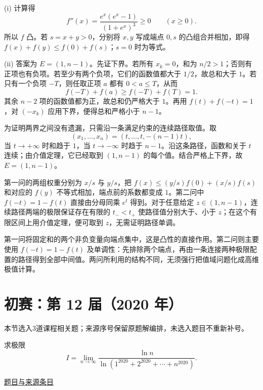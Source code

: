 \documentclass[12pt,fontset=fandol]{ctexart}
\begin{document}
\begin{solve}\label{ans:ch10-11th-A:6}

(i) 计算得
\[
f''(x)=\frac{e^x(e^x-1)}{(1+e^x)^3}\geq0\qquad(x\geq0).
\]
所以 $f$ 凸。若 $s=x+y>0$，分别将 $x,y$ 写成端点 $0,s$ 的凸组合并相加，即得 $f(x)+f(y)\leq f(0)+f(s)$；$s=0$ 时为等式。

(ii) 答案为 $E=(1,n-1)$。先证下界。若所有 $x_k=0$，和为 $n/2>1$；否则有正项也有负项。若至少有两个负项，它们的函数值都大于 $1/2$，故总和大于 $1$。若只有一个负项 $-T$，则任取正项 $a$ 都有 $0<a\leq T$，从而
\[
f(-T)+f(a)\geq f(-T)+f(T)=1.
\]
其余 $n-2$ 项的函数值都为正，故总和仍严格大于 $1$。再用 $f(t)+f(-t)=1$，对 $(-x_k)$ 应用下界，便得总和严格小于 $n-1$。

为证明两界之间没有遗漏，只需沿一条满足约束的连续路径取值。取
\[
(x_1,\ldots,x_n)=(t,\ldots,t,-(n-1)t),
\]
当 $t\to+\infty$ 时和趋于 $1$，当 $t\to-\infty$ 时趋于 $n-1$。沿这条路径，函数和关于 $t$ 连续；由介值定理，它已经取到 $(1,n-1)$ 的每个值。结合严格上下界，故 $E=(1,n-1)$。

第一问的两组权重分别为 $x/s$ 与 $y/s$，把 $f(x)\le(y/s)f(0)+(x/s)f(s)$ 和对应的 $f(y)$ 不等式相加，端点前的系数都变成 $1$。第二问中 $f(-t)=1-f(t)$ 直接由分母同乘 $e^t$ 得到。对于任意给定 $z\in(1,n-1)$，连续路径两端的极限保证存在有限的 $t_-<t_+$ 使路径值分别大于、小于 $z$；在这个有限区间上用介值定理，便可取到 $z$，无需证明路径单调。

\end{solve}

\begin{remark}[方法与条件]第一问将固定和的两个非负变量向端点集中，这是凸性的直接作用。第二问则主要使用 $f(-t)=1-f(t)$ 及单调性：先排除两个端点，再由一条连接两种极限配置的路径得到全部中间值。两问所利用的结构不同，无须强行把值域问题化成高维极值计算。\end{remark}

\section{初赛：第 12 届（2020 年）}

本节选入3道课程相关题；来源序号保留原题解编排，未选入题目不重新补号。

\begin{example}[来源序号2]\label{ex:ch09-12th-A:2}\label{pr:ch09-12th-A:2}

求极限
\[
I=\lim_{n\to\infty}\frac{\ln n}{\ln\left(1^{2020}+2^{2020}+\cdots+n^{2020}\right)}.
\]

\par\href{https://github.com/lzxcr/cmc-mathematics/blob/64916fa1fdbc3e444a652eca204d5669058ee321/src/problems/preliminary/12/02.md}{题目与来源条目}

\end{example}
\end{document}
